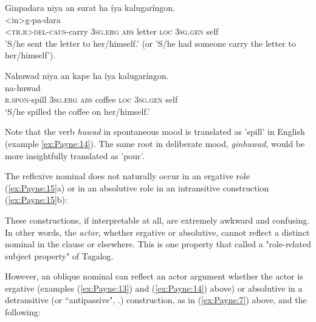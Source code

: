 \documentclass[output=paper]{langscibook}
\begin{document}
\ea
\label{ex:Payne:13}
\glll Ginpadara niya an surat ha íya kalugaríngon.\\
<in>g-pa-dara {} {} {} {} {} {}\\
<\textsc{tr.r}>\textsc{del-caus}-carry 3\textsc{sg.erg} \textsc{abs} letter \textsc{loc} 3\textsc{sg.gen} self\\
\glt'S/he sent the letter to her/himself.' (or 'S/he had someone carry the letter to her/himself').
\z

\ea
\label{ex:Payne:14}
\glll
Nahuwad niya an kape ha íya kalugaríngon.\\
na-huwad { } { } { } { } { } { }\\
\textsc{r.spon}-spill 3\textsc{sg.erg} \textsc{abs} coffee \textsc{loc} 3\textsc{sg.gen} self\\
\glt ‘S/he spilled the coffee on her/himself.'
\z

Note that the verb \textit{huwad} in spontaneous mood is translated as 'spill' in English (example \ref{ex:Payne:14}). The same root in deliberate mood, \textit{ginhuwad}, would be more insightfully translated as 'pour'.

The reflexive nominal does not naturally occur in an ergative role (\ref{ex:Payne:15}a) or in an absolutive role in an intransitive construction (\ref{ex:Payne:15}b): 

\ea
\label{ex:Payne:15}

\z
\z


These constructions, if interpretable at all, are extremely awkward and confusing. In other words, the \textit{actor}, whether ergative or absolutive, cannot reflect a distinct nominal in the clause or elsewhere. This is one property that \citet{Schachter1977} called a "role-related subject property" of Tagalog.

However, an oblique nominal can reflect an actor argument whether the actor is ergative (examples (\ref{ex:Payne:13}) and (\ref{ex:Payne:14}) above) or absolutive in a detransitive (or ``antipassive", \citealt{OyzonPayneinprep}.) construction, as in (\ref{ex:Payne:7}) above, and the following: 
\end{document}
